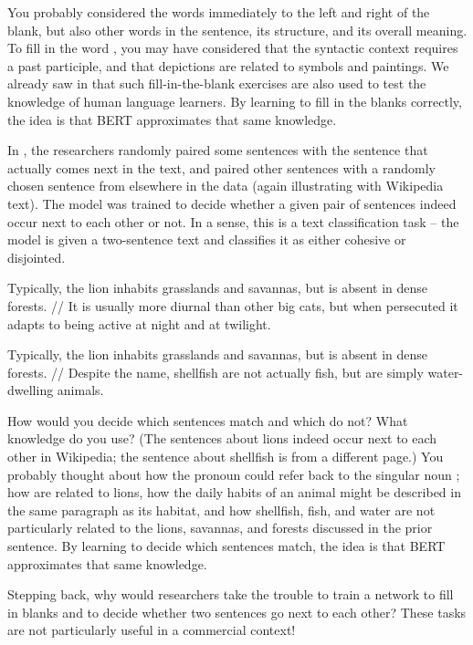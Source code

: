You probably considered the words immediately to the left and right of the blank, but also other words in the sentence, its structure, and its overall meaning.  To fill in the word , you may have considered that the syntactic context requires a past participle, and that depictions are related to symbols and paintings. We already saw in  that such fill-in-the-blank exercises are also used to test the knowledge of human language learners.  By learning to fill in the blanks correctly, the idea is that BERT approximates that same knowledge.  



In , the researchers randomly paired some sentences with the sentence that actually comes next in the text, and paired other sentences with a randomly chosen sentence from elsewhere in the data (again illustrating with Wikipedia text).  The model was trained to decide whether a given pair of sentences indeed occur next to each other or not.  In a sense, this is a text classification task -- the model is given a two-sentence text and classifies it as either cohesive or disjointed.

\ea Typically, the lion inhabits grasslands and savannas, but is absent in dense forests. // It is usually more diurnal than other big cats, but when persecuted it adapts to being active at night and at twilight.



\ex Typically, the lion inhabits grasslands and savannas, but is absent in dense forests.  // Despite the name, shellfish are not actually fish, but are simply water-dwelling animals.

\z 

How would you decide which sentences match and which do not?  What knowledge do you use?   (The sentences about lions indeed occur next to each other in Wikipedia; the sentence about shellfish is from a different page.) You probably thought about how the pronoun  could refer back to the singular noun ; how  are related to lions, how the daily habits of an animal might be described in the same paragraph as its habitat, and how shellfish, fish, and water are not particularly related to the lions, savannas, and forests discussed in the prior sentence.  By learning to decide which sentences match, the idea is that BERT approximates that same knowledge. 

Stepping back, why would researchers take the trouble to train a network to fill in blanks and to decide whether two sentences go next to each other?  These tasks are not particularly useful in a commercial context!

